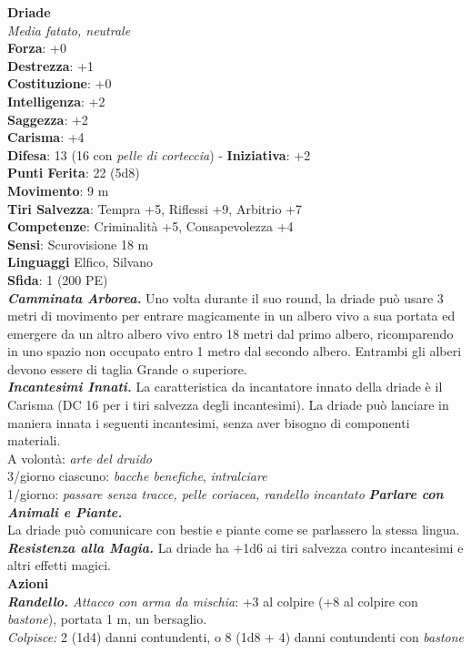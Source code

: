 \begin{multicols}{2}
\medskip\textbf{Driade}\\
\emph{Media fatato, neutrale}\\
\textbf{Forza}: +0\\
\textbf{Destrezza}: +1\\
\textbf{Costituzione}: +0\\
\textbf{Intelligenza}: +2\\
\textbf{Saggezza}: +2\\
\textbf{Carisma}: +4\\
\textbf{Difesa}: 13 (16 con \emph{pelle di corteccia}) - \textbf{Iniziativa}: +2\\
\textbf{Punti Ferita}: 22 (5d8)\\
\textbf{Movimento}: 9 m\\
\textbf{Tiri Salvezza}: Tempra +5, Riflessi +9, Arbitrio +7\\
\textbf{Competenze}: Criminalità +5, Consapevolezza +4\\
\textbf{Sensi}: Scurovisione 18 m\\
\textbf{Linguaggi} Elfico, Silvano\\
\textbf{Sfida}: 1 (200 PE)\smallskip\\
\emph{\textbf{Camminata Arborea.}} Uno volta durante il suo round, la driade può usare 3 metri di movimento per entrare magicamente in un albero vivo a sua portata ed emergere da un altro albero vivo entro 18 metri dal primo albero, ricomparendo in uno spazio non occupato entro 1 metro dal secondo albero. Entrambi gli alberi devono essere di taglia Grande o superiore.\\
\emph{\textbf{Incantesimi Innati.}} La caratteristica da incantatore innato della driade è il Carisma (DC  16 per i tiri salvezza degli incantesimi). La driade può lanciare in maniera innata i seguenti incantesimi, senza aver bisogno di componenti materiali.\\
A volontà: \emph{arte del druido}\\
3/giorno ciascuno: \emph{bacche benefiche}, \emph{intralciare}\\
1/giorno: \emph{passare senza tracce, pelle coriacea, randello} \emph{incantato} \emph{\textbf{Parlare con Animali e Piante.}}\\
La driade può comunicare con bestie e piante come se parlassero la stessa lingua.\\
\emph{\textbf{Resistenza alla Magia.}} La driade ha +1d6 ai tiri salvezza contro incantesimi e altri effetti magici.\\
\smallskip\textbf{Azioni}\\
\emph{\textbf{Randello.} Attacco con arma da mischia}: +3 al colpire (+8 al colpire con \emph{bastone}), portata 1 m, un bersaglio.\\
\emph{Colpisce:} 2 (1d4) danni contundenti, o 8 (1d8 + 4) danni contundenti con \emph{bastone}\\


\end{multicols}
